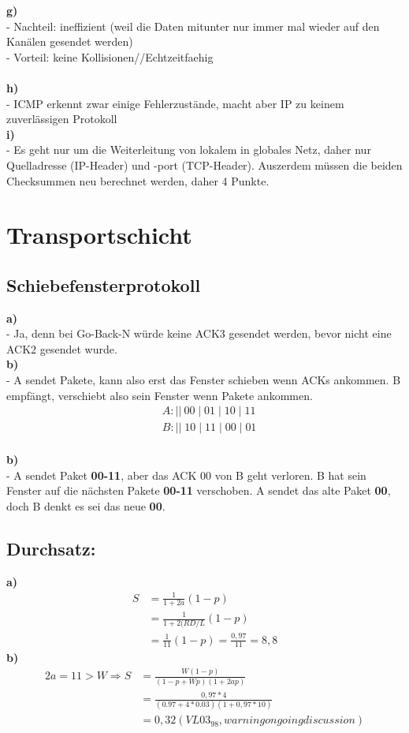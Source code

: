 \documentclass{article}
\begin{document}
			\textbf{g)}\\
				- Nachteil: ineffizient (weil die Daten mitunter nur immer mal wieder auf den Kanälen
				 gesendet werden)\\
				- Vorteil: keine Kollisionen//Echtzeitfaehig\\\\
			\textbf{h)}\\
				- ICMP erkennt zwar einige Fehlerzust\"ande, macht aber IP zu keinem zuverl\"assigen 
				Protokoll\\
			\textbf{i)}\\
				- Es geht nur um die Weiterleitung von lokalem in globales Netz, daher nur Quelladresse
				 (IP-Header) und -port (TCP-Header). Auszerdem m\"ussen die beiden Checksummen neu
				  berechnet werden, daher 4 Punkte.\\
	\section{Transportschicht}
		\subsection{Schiebefensterprotokoll}	
			\textbf{a)}\\
				- Ja, denn bei Go-Back-N w\"urde keine ACK3 gesendet werden, bevor nicht eine ACK2 
				gesendet wurde.\\
			\textbf{b)}\\
				- A sendet Pakete, kann also erst das Fenster schieben wenn ACKs ankommen. B empf\"angt,
				 verschiebt also sein Fenster wenn Pakete ankommen.
				\begin{align*}
					&A: ||\:00\;|\;01\;|\;10\;|\;11 \\
					&B: ||\;10\;|\;11\;|\;00\;|\;01
				\end{align*}\\
			\textbf{b)}\\
				- A sendet Paket \textbf{00-11}, aber das ACK 00 von B geht verloren. B hat sein Fenster
				auf die	n\"achsten Pakete \textbf{00-11} verschoben. A sendet das alte Paket \textbf{00}, 
				doch B denkt es sei das neue \textbf{00}.\\
		\subsection{Durchsatz:}
			\textbf{a)}
				\begin{align*}			 
					S &= \frac{1}{1+2a}(1-p)\\ 
					&= \frac{1}{1+2(RD/L}(1-p)\\
					&= \frac{1}{11}(1-p) = \frac{0,97}{11} = 8,8%
				\end{align*}
			\textbf{b)}
				\begin{align*}
				2a = 11 > W \Rightarrow S 	&= \frac{W(1-p)}{(1-p+Wp)(1+2ap)}\\
											&= \frac{0,97 * 4}{(0.97+4*0.03)(1+0,97*10)}\\ 
											&= 0,32 (VL 03_98, warning ongoing discussion)
				\end{align*}
\end{document}

